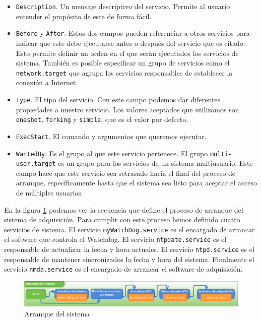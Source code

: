 	\begin{itemize}
		\item	\texttt{Description}. Un mensaje descriptivo del servicio. Permite al usuario entender el propósito de este de forma fácil.
		\item	\texttt{Before} y \texttt{After}. Estos dos campos pueden referenciar a otros servicios para indicar que este debe ejecutarse
			antes o después del servicio que es citado. Esto permite definir un orden en el que serán ejecutados los servicios de sistema.
			También es posible especificar un grupo de servicios como el \texttt{network.target} que agrupa los servicios responsables de
			establecer la conexión a Internet. 
		\item	\texttt{Type}. El tipo del servicio. Con este campo podemos dar diferentes propiedades a nuestro servicio. Los valores
			aceptados que utilizamos son \texttt{oneshot}, \texttt{forking} y \texttt{simple}, que es el valor por defecto.
		\item	\texttt{ExecStart}. El comando y argumentos que queremos ejecutar.
		\item	\texttt{WantedBy}. Es el grupo al que este servicio pertenece. El grupo \texttt{multi-user.target} es un grupo para los
			servicios de un sistema multiusuario. Este campo hace que este servicio sea retrasado hacia el final del proceso de arranque,
			específicamente hasta que el sistema sea listo para aceptar el acceso de múltiples usuarios. 
	\end{itemize}
	\par
	En la figura \ref{fig:boot} podemos ver la secuencia que define el proceso de arranque del sistema de adquisición. Para cumplir con este
	proceso hemos definido cuatro servicios de sistema. El servicio \texttt{myWatchDog.service} es el encargado de arrancar el software que
	controla el Watchdog. El servicio \texttt{ntpdate.service} es el responsable de actualizar la fecha y hora actuales. El servicio
	\texttt{ntpd.service} es el responsable de mantener sincronizados la fecha y hora del sistema. Finalmente el servicio \texttt{nmda.service} es
	el encargado de arrancar el software de adquisición.
	\begin{figure}[h]
		\centering
		\includegraphics[keepaspectratio, width=1\textwidth]{./img/boot.png}
		\caption{Arranque del sistema}   
		\label{fig:boot}
	\end{figure}
